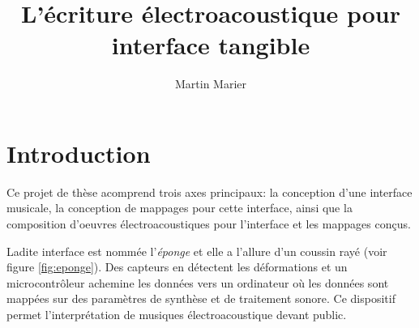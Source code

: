 \documentclass[11pt]{article}
\author{Martin Marier}
\date{}
\title{L'écriture électroacoustique pour interface tangible}
\begin{document}
\maketitle

\section*{Introduction}
\label{sec-1}
Ce projet de thèse acomprend trois axes principaux: la conception d'une interface
musicale, la conception de mappages pour cette interface, ainsi que la
composition d'oeuvres électroacoustiques pour l'interface et les mappages
conçus.

Ladite interface est nommée l'\emph{éponge} et elle a l'allure d'un coussin rayé
(voir figure \ref{fig:eponge}).  Des capteurs en détectent les déformations
et un microcontrôleur achemine les données vers un ordinateur où les données
sont mappées sur des paramètres de synthèse et de traitement sonore.  Ce
dispositif permet l'interprétation de musiques électroacoustique devant
public.
\end{document}
